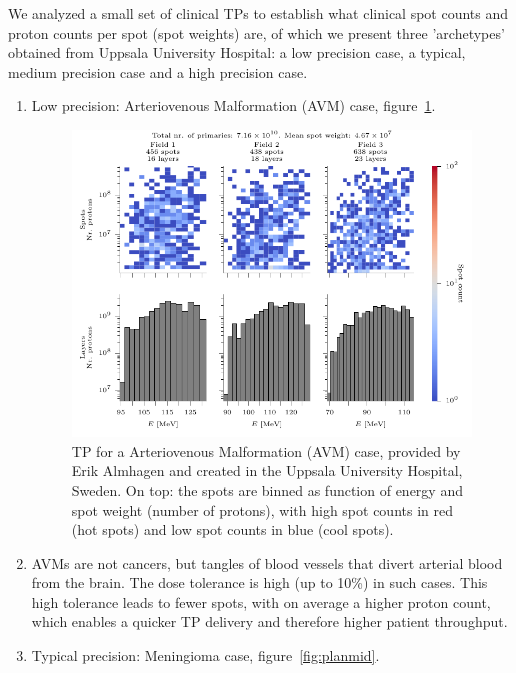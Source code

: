 \documentclass[a4paper,english]{article}
\begin{document}
We analyzed a small set of clinical TPs to establish what clinical spot counts and proton counts per spot (spot weights) are, of which we present three 'archetypes' obtained from Uppsala University Hospital: a low precision case, a typical, medium precision case and a high precision case.

\begin{enumerate}[noitemsep]
\item Low precision: Arteriovenous Malformation (AVM) case, figure~\ref{fig:planlow}.

\begin{figure}[htp]
  \centering
  \includegraphics[width=0.8\linewidth]{AVM_F1nonorm-plot}
  \caption{TP for a Arteriovenous Malformation (AVM) case, provided by Erik Almhagen and created in the Uppsala University Hospital, Sweden. On top: the spots are binned as function of energy and spot weight (number of protons), with high spot counts in red (hot spots) and low spot counts in blue (cool spots).}
  \label{fig:planlow}
\end{figure}

\item[] AVMs are not cancers, but tangles of blood vessels that divert arterial blood from the brain. The dose tolerance is high (up to 10\%) in such cases. This high tolerance leads to fewer spots, with on average a higher proton count, which enables a quicker TP delivery and therefore higher patient throughput.%

\item Typical precision: Meningioma case, figure~\ref{fig:planmid}.


\end{enumerate}
\end{document}
